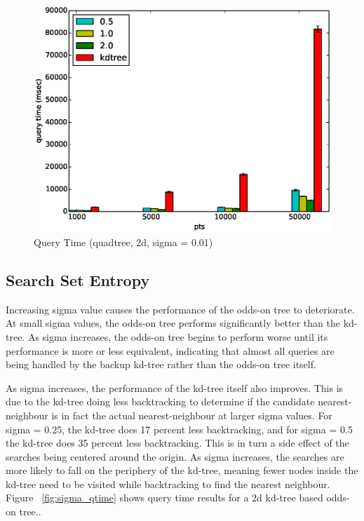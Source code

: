 \documentclass[mcs]{scsthesis}
\begin{document}
\begin{figure}
\begin{center}
\includegraphics[scale=0.5]{diagrams/2d_group_bypts_sigma0.01_qtime_qt.eps}
\caption{Query Time (quadtree, 2d, sigma = 0.01)}
\label{fig:point_set_size_qtime_qt}
\end{center}
\end{figure}

\subsection{Search Set Entropy}

Increasing sigma value causes the performance of the odds-on tree to
deteriorate.  At small sigma values, the odds-on tree performs significantly
better than the kd-tree. As sigma increases, the odds-on tree begins to perform
worse until its performance is more or less equivalent, indicating that almost
all queries are being handled by the backup kd-tree rather than the odds-on
tree itself.

As sigma increases, the performance of the kd-tree itself also improves.
This is due to the kd-tree doing less backtracking to determine if the
candidate nearest-neighbour is in fact the actual nearest-neighbour at
larger sigma values. For sigma = 0.25, the kd-tree does 17 percent less
backtracking, and for sigma = 0.5 the kd-tree does 35 percent less
backtracking. This is in turn a side effect of the searches being centered
around the origin. As sigma increases, the searches are more likely to
fall on the periphery of the kd-tree, meaning fewer nodes inside the
kd-tree need to be visited while backtracking to find the nearest
neighbour. Figure ~\ref{fig:sigma_qtime} shows query time results for a 2d
kd-tree based odds-on tree..
\end{document}
